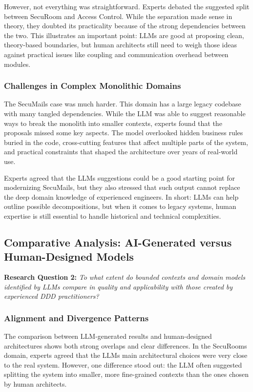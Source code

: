 However, not everything was straightforward. Experts debated the suggested split between SecuRoom and Access Control. While the separation made sense in theory, they doubted its practicality because of the strong dependencies between the two. This illustrates an important point: LLMs are good at proposing clean, theory-based boundaries, but human architects still need to weigh those ideas against practical issues like coupling and communication overhead between modules.

\subsubsection{Challenges in Complex Monolithic Domains}
The SecuMails case was much harder. This domain has a large legacy codebase with many tangled dependencies. While the LLM was able to suggest reasonable ways to break the monolith into smaller contexts, experts found that the proposals missed some key aspects. The model overlooked hidden business rules buried in the code, cross-cutting features that affect multiple parts of the system, and practical constraints that shaped the architecture over years of real-world use.

Experts agreed that the LLMs suggestions could be a good starting point for modernizing SecuMails, but they also stressed that such output cannot replace the deep domain knowledge of experienced engineers. In short: LLMs can help outline possible decompositions, but when it comes to legacy systems, human expertise is still essential to handle historical and technical complexities.

\subsection{Comparative Analysis: AI-Generated versus Human-Designed Models}

\textbf{Research Question 2:} \textit{To what extent do bounded contexts and domain models identified by LLMs compare in quality and applicability with those created by experienced DDD practitioners?}

\subsubsection{Alignment and Divergence Patterns}
The comparison between LLM-generated results and human-designed architectures shows both strong overlaps and clear differences. In the SecuRooms domain, experts agreed that the LLMs main architectural choices were very close to the real system. However, one difference stood out: the LLM often suggested splitting the system into smaller, more fine-grained contexts than the ones chosen by human architects. 

